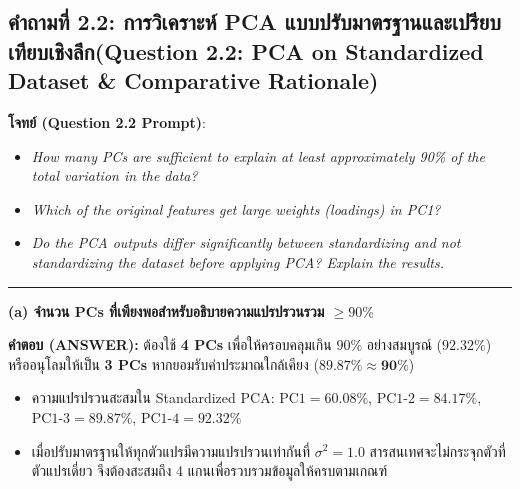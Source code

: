 \documentclass[12pt,a4paper]{article}
\begin{document}
\clearpage
\subsection*{คำถามที่ 2.2: การวิเคราะห์ PCA แบบปรับมาตรฐานและเปรียบเทียบเชิงลึก\newline \normalsize(Question 2.2: PCA on Standardized Dataset \& Comparative Rationale)}
\vspace{-0.5em}

\begin{ansbox}[fontupper=\small, left=6pt, right=6pt, top=3pt, bottom=3pt]
\textbf{โจทย์ (Question 2.2 Prompt)}:
\begin{itemize}[leftmargin=1.2em, itemsep=0pt, topsep=0pt, parsep=0pt]
    \item[(a)] \textit{How many PCs are sufficient to explain at least approximately 90\% of the total variation in the data?}
    \item[(b)] \textit{Which of the original features get large weights (loadings) in PC1?}
    \item[(c)] \textit{Do the PCA outputs differ significantly between standardizing and not standardizing the dataset before applying PCA? Explain the results.}
\end{itemize}

\vspace{-0.2em}
\noindent\rule{\linewidth}{0.4pt}
\vspace{-0.2em}

\noindent\textbf{\normalsize (a) จำนวน PCs ที่เพียงพอสำหรับอธิบายความแปรปรวนรวม $\ge 90\%$}\par\vspace{0.05em}
\textbf{คำตอบ (ANSWER):} ต้องใช้ \textbf{4 PCs} เพื่อให้ครอบคลุมเกิน $90\%$ อย่างสมบูรณ์ ($\mathbf{92.32\%}$) หรืออนุโลมให้เป็น \textbf{3 PCs} หากยอมรับค่าประมาณใกล้เคียง ($\mathbf{89.87\% \approx 90\%}$)
\begin{itemize}[leftmargin=1.3em, itemsep=0.5pt, topsep=0.5pt]
    \item ความแปรปรวนสะสมใน Standardized PCA: $\text{PC1} = 60.08\%$, $\text{PC1-2} = 84.17\%$, $\text{PC1-3} = 89.87\%$, $\text{PC1-4} = \mathbf{92.32\%}$
    \item เมื่อปรับมาตรฐานให้ทุกตัวแปรมีความแปรปรวนเท่ากันที่ $\sigma^2 = 1.0$ สารสนเทศจะไม่กระจุกตัวที่ตัวแปรเดี่ยว จึงต้องสะสมถึง 4 แกนเพื่อรวบรวมข้อมูลให้ครบตามเกณฑ์
\end{itemize}


\end{ansbox}
\end{document}
